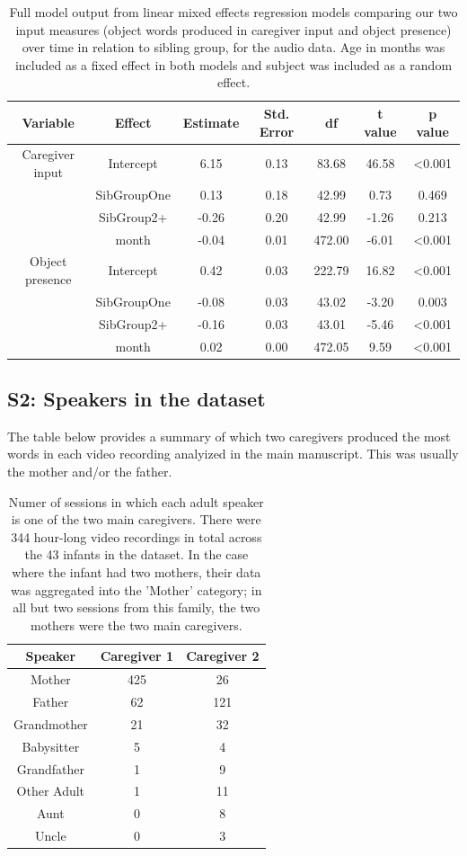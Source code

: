\documentclass[
  english,
  man,floatsintext]{apa6}
\begin{document}
\begin{longtable}[t]{ccccccc}
\caption{\label{tab:table-input-model-summary-audio}Full model output from linear mixed effects regression models comparing our two input measures (object words produced in caregiver input and object presence) over time in relation to sibling group, for the audio data. Age in months was included as a fixed effect in both models and subject was included as a random effect.}\\
\toprule
Variable & Effect & Estimate & Std. Error & df & t value & p value\\
\midrule
Caregiver input & Intercept & 6.15 & 0.13 & 83.68 & 46.58 & <0.001\\
 & SibGroupOne & 0.13 & 0.18 & 42.99 & 0.73 & 0.469\\
 & SibGroup2+ & -0.26 & 0.20 & 42.99 & -1.26 & 0.213\\
 & month & -0.04 & 0.01 & 472.00 & -6.01 & <0.001\\
\midrule
Object presence & Intercept & 0.42 & 0.03 & 222.79 & 16.82 & <0.001\\
\addlinespace
 & SibGroupOne & -0.08 & 0.03 & 43.02 & -3.20 & 0.003\\
 & SibGroup2+ & -0.16 & 0.03 & 43.01 & -5.46 & <0.001\\
 & month & 0.02 & 0.00 & 472.05 & 9.59 & <0.001\\
\bottomrule
\end{longtable}

\newpage

\hypertarget{s2-speakers-in-the-dataset}{%
\subsection{S2: Speakers in the dataset}\label{s2-speakers-in-the-dataset}}

The table below provides a summary of which two caregivers produced the most words in each video recording analyized in the main manuscript. This was usually the mother and/or the father.

\begin{longtable}[t]{ccc}
\caption{\label{tab:table-speakers-sessions}Numer of sessions in which each adult speaker is one of the two main caregivers. There were 344 hour-long video recordings in total across the 43 infants in the dataset. In the case where the infant had two mothers, their data was aggregated into the 'Mother' category; in all but two sessions from this family, the two mothers were the two main caregivers.}\\
\toprule
Speaker & Caregiver 1 & Caregiver 2\\
\midrule
Mother & 425 & 26\\
Father & 62 & 121\\
Grandmother & 21 & 32\\
Babysitter & 5 & 4\\
Grandfather & 1 & 9\\
\addlinespace
Other Adult & 1 & 11\\
Aunt & 0 & 8\\
Uncle & 0 & 3\\
\bottomrule
\end{longtable}
\end{document}
